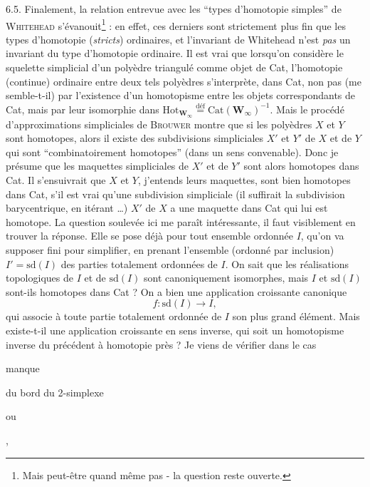 \documentclass[11pt]{article}
\newcommand{\msp}[1]{\marginpar{\footnotesize [#1]}}
\begin{document}
\msp{page 92}
6.5. Finalement, la relation entrevue avec les “types d'homotopie simples” de \textsc{Whitehead} s'évanouit\footnote[44]{Mais peut-être quand même pas - la question reste ouverte.} : en effet, ces derniers sont strictement plus fin que les types d'homotopie (\textit{stricts}) ordinaires, et l'invariant de Whitehead n'est \textit{pas} un invariant du type d'homotopie ordinaire. Il est vrai que lorsqu'on considère le squelette simplicial d'un polyèdre triangulé comme objet de Cat, l'homotopie (continue) ordinaire entre deux tels polyèdres s'interprète, dans Cat, non pas (me semble-t-il) par l'existence d'un homotopisme entre les objets correspondants de Cat, mais par leur isomorphie dans $\mathrm{Hot}_{\mathbf{W}_\infty} \overset{\text{déf}}{=} \mathrm{Cat}(\mathbf{W}_\infty)^{-1}$. Mais le procédé d'approximations simpliciales de \textsc{Brouwer} montre que si les polyèdres $X$ et $Y$ sont homotopes, alors il existe des subdivisions simpliciales $X'$ et $Y'$ de $X$ et de $Y$ qui sont “combinatoirement homotopes” (dans un sens convenable). Donc je présume que les maquettes simpliciales de $X'$ et de $Y'$ sont alors homotopes dans Cat. Il s'ensuivrait que %
\msp{page 93}
$X$ et $Y$, j'entends leurs maquettes, sont bien homotopes dans Cat, s'il est vrai qu'une subdivision simpliciale (il suffirait la subdivision barycentrique, en itérant \ldots) $X'$ de $X$ a une maquette dans Cat qui lui est homotope. La question soulevée ici me paraît intéressante, il faut visiblement en trouver la réponse. Elle se pose déjà pour tout ensemble ordonnée $I$, qu'on va supposer fini pour simplifier, en prenant l'ensemble (ordonné par inclusion) $I' = \mathrm{sd}(I)$ des parties totalement ordonnées de $I$. On sait que les réalisations topologiques de $I$ et de $\mathrm{sd}(I)$ sont canoniquement isomorphes, mais $I$ et $\mathrm{sd}(I)$ sont-ils homotopes dans Cat ? On a bien une application croissante canonique %
\[ f : \mathrm{sd}(I) \longrightarrow I, \]
qui associe à toute partie totalement ordonnée de $I$ son plus grand élément. Mais existe-t-il une application croissante en sens inverse, qui soit un homotopisme inverse du précédent à homotopie près ? Je viens de vérifier dans le cas

\msp{page 94} manque

\msp{page 95}
du bord du 2-simplexe

\begin{center}
\qquad\qquad\qquad ou \qquad\qquad\qquad
{}
\qquad\quad ,
\end{center}
\end{document}
